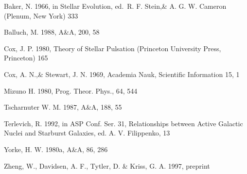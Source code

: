 \documentclass{aa}
\begin{document}
%

\begin{thebibliography}{}

	 Baker, N. 1966,
	in Stellar Evolution,
	ed.\ R. F. Stein,\& A. G. W. Cameron
	(Plenum, New York) 333

	 Balluch, M. 1988,
	A\&A, 200, 58

	 Cox, J. P. 1980,
	Theory of Stellar Pulsation
	(Princeton University Press, Princeton) 165

	 Cox, A. N.,\& Stewart, J. N. 1969,
	Academia Nauk, Scientific Information 15, 1

	 Mizuno H. 1980,
	Prog. Theor. Phys., 64, 544

	 Tscharnuter W. M. 1987,
	A\&A, 188, 55

	 Terlevich, R. 1992, in ASP Conf. Ser. 31,
	Relationships between Active Galactic Nuclei and Starburst Galaxies,
	ed. A. V. Filippenko, 13

	 Yorke, H. W. 1980a,
	A\&A, 86, 286

	 Zheng, W., Davidsen, A. F., Tytler, D. \& Kriss, G. A.
	1997, preprint
\end{thebibliography}




\end{document}
